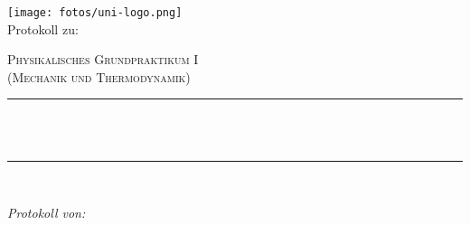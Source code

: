 \makeatletter
\let\thetitle \@title{}
\let\theauthor \@author{}
\let\thedate \@date{}
\makeatother

\fancyhf{}

    \begin{titlepage}
        \centering
        \vspace*{0.5 cm}
        \texttt{[image: fotos/uni-logo.png]} \\ [2.0 cm]

        Protokoll zu: \\
        \begin{center}    
            \textsc{ \Large Physikalisches Grundpraktikum I \\ (Mechanik und Thermodynamik)} \\ [2.0 cm]
        \end{center}
        
        \rule{\linewidth}{0.2 mm} \\ [0.4 cm]
        { \huge \bfseries \thetitle} \\
        \rule{\linewidth}{0.2 mm} \\ [1.5 cm]
                
        \begin{minipage}{ 0.4 \textwidth }
            \begin{flushright} \large
                \emph{Protokoll von: } \\
                \theauthor{}
            \end{flushright}
        \end{minipage} \\ [2 cm]
        
    \end{titlepage}
